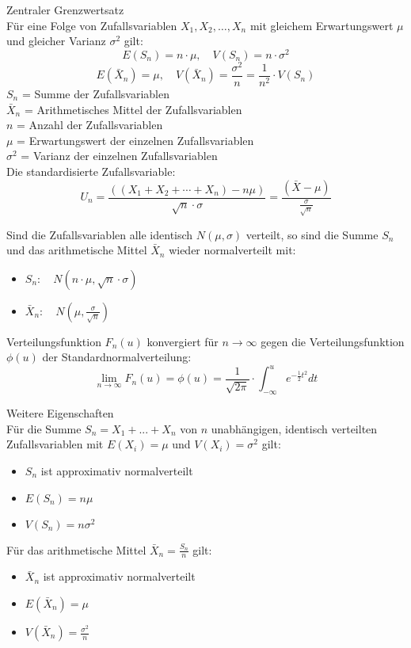 \begin{theorem}{Zentraler Grenzwertsatz}\\
Für eine Folge von Zufallsvariablen $X_1, X_2, \ldots, X_n$ mit gleichem Erwartungswert $\mu$ und gleicher Varianz $\sigma^2$ gilt:
$$
E(S_n)=n \cdot \mu, \quad V(S_n)=n \cdot \sigma^2
$$
$$
E(\bar{X}_n)=\mu, \quad V(\bar{X}_n)=\frac{\sigma^2}{n}=\frac{1}{n^2} \cdot V(S_n)
$$
$S_n$ = Summe der Zufallsvariablen\\
$\bar{X}_n$ = Arithmetisches Mittel der Zufallsvariablen\\
$n$ = Anzahl der Zufallsvariablen\\
$\mu$ = Erwartungswert der einzelnen Zufallsvariablen\\
$\sigma^2$ = Varianz der einzelnen Zufallsvariablen\\

Die standardisierte Zufallsvariable:
$$
U_n=\frac{((X_1+X_2+\cdots+X_n)-n\mu)}{\sqrt{n} \cdot \sigma}=\frac{(\bar{X}-\mu)}{\frac{\sigma}{\sqrt{n}}}
$$

Sind die Zufallsvariablen alle identisch $N(\mu,\sigma)$ verteilt, so sind die Summe $S_n$ und das arithmetische Mittel $\bar{X}_n$ wieder normalverteilt mit:
\begin{itemize}
  \item $S_n: \quad N(n \cdot \mu, \sqrt{n} \cdot \sigma)$
  \item $\bar{X}_n: \quad N(\mu, \frac{\sigma}{\sqrt{n}})$
\end{itemize}
\vspace{3mm}
Verteilungsfunktion $F_n(u)$ konvergiert für $n \to \infty$ gegen die Verteilungsfunktion $\phi(u)$ der Standardnormalverteilung:
$$
\lim_{n\to\infty} F_n(u) = \phi(u) = \frac{1}{\sqrt{2\pi}} \cdot \int_{-\infty}^u e^{-\frac{1}{2}t^2} dt
$$
\end{theorem}

\begin{corollary}{Weitere Eigenschaften}\\
Für die Summe $S_n = X_1 + ... + X_n$ von $n$ unabhängigen, identisch verteilten Zufallsvariablen mit $E(X_i)=\mu$ und $V(X_i)=\sigma^2$ gilt:

\begin{itemize}
    \item $S_n$ ist approximativ normalverteilt
    \item $E(S_n) = n\mu$
    \item $V(S_n) = n\sigma^2$
\end{itemize}

Für das arithmetische Mittel $\bar{X}_n = \frac{S_n}{n}$ gilt:
\begin{itemize}
    \item $\bar{X}_n$ ist approximativ normalverteilt
    \item $E(\bar{X}_n) = \mu$
    \item $V(\bar{X}_n) = \frac{\sigma^2}{n}$
\end{itemize}
\end{corollary}

